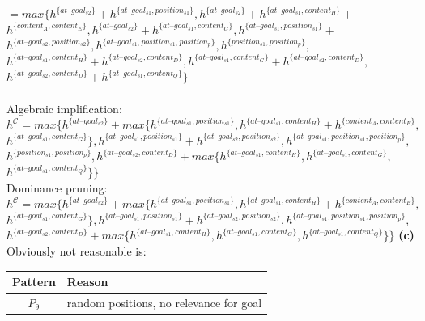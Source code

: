 \documentclass[11pt,a4paper]{article}
\newcommand{\h}[0]{\text{--}}
\begin{document}
\hphantom{tab}$=max\{h^{\{at\h goal_{s2}\}}+h^{\{at\h goal_{s1},position_{s1}\}},h^{\{at\h goal_{s2}\}}+h^{\{at\h goal_{s1},content_H\}}+$\\
\hphantom{tabta}$h^{\{content_A,content_E\}},h^{\{at\h goal_{s2}\}}+h^{\{at\h goal_{s1},content_G\}},h^{\{at\h goal_{s1},position_{s1}\}}+$\\
\hphantom{tabta}$h^{\{at\h goal_{s2},position_{s2}\}},h^{\{at\h goal_{s1},position_{s1},position_{p}\}},h^{\{position_{s1},position_{p}\}},$\\
\hphantom{tabta}$h^{\{at\h goal_{s1},content_H\}}+h^{\{at\h goal_{s2},content_D\}},h^{\{at\h goal_{s1},content_G\}}+h^{\{at\h goal_{s2},content_D\}},$\\
\hphantom{tabta}$h^{\{at\h goal_{s2},content_D\}}+h^{\{at\h goal_{s1},content_Q\}}\}$\\
\\
Algebraic implification:\\
$h^\mathscr{C}=max\{h^{\{at\h goal_{s2}\}}+max\{h^{\{at\h goal_{s1},position_{s1}\}},h^{\{at\h goal_{s1},content_H\}}+h^{\{content_A,content_E\}},$\\
\hphantom{tabta}$h^{\{at\h goal_{s1},content_G\}}\},h^{\{at\h goal_{s1},position_{s1}\}}+h^{\{at\h goal_{s2},position_{s2}\}},h^{\{at\h goal_{s1},position_{s1},position_{p}\}},$\\
\hphantom{tabta}$h^{\{position_{s1},position_{p}\}},h^{\{at\h goal_{s2},content_D\}}+max\{h^{\{at\h goal_{s1},content_H\}},h^{\{at\h goal_{s1},content_G\}},$\\
\hphantom{tabta}$h^{\{at\h goal_{s1},content_Q\}}\}\}$\\
Dominance pruning:\\
$h^\mathscr{C}=max\{h^{\{at\h goal_{s2}\}}+max\{h^{\{at\h goal_{s1},position_{s1}\}},h^{\{at\h goal_{s1},content_H\}}+h^{\{content_A,content_E\}},$\\
\hphantom{tabta}$h^{\{at\h goal_{s1},content_G\}}\},h^{\{at\h goal_{s1},position_{s1}\}}+h^{\{at\h goal_{s2},position_{s2}\}},h^{\{at\h goal_{s1},position_{s1},position_{p}\}},$\\
\hphantom{tabta}$h^{\{at\h goal_{s2},content_D\}}+max\{h^{\{at\h goal_{s1},content_H\}},h^{\{at\h goal_{s1},content_G\}},h^{\{at\h goal_{s1},content_Q\}}\}\}$\newpage
\textbf{(c)} Obviously not reasonable is:\\
\begin{tabular}{c|l}
Pattern & Reason\\
\hline
$P_9$ & random positions, no relevance for goal\\
\end{tabular}\\
\end{document}
